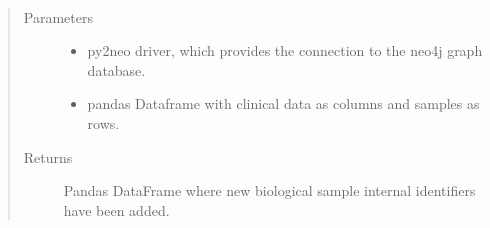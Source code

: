 \documentclass[letterpaper,10pt,english]{sphinxmanual}
\begin{document}

\begin{fulllineitems}
\label{\detokenize{_autosummary/report_manager.apps:report_manager.apps.dataUpload.create_new_biosamples}}~\begin{quote}\begin{description}
\item[{Parameters}] \leavevmode\begin{itemize}
\item {} 
 \textendash{} py2neo driver, which provides the connection to the neo4j graph database.

\item {} 
 \textendash{} pandas Dataframe with clinical data as columns and samples as rows.

\end{itemize}

\item[{Returns}] \leavevmode
Pandas DataFrame where new biological sample internal identifiers have been added.

\end{description}\end{quote}

\end{fulllineitems}

\end{document}
